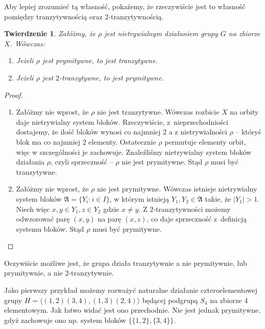 \documentclass[licencjacka]{pracamgr}
\newtheorem{thh}{Twierdzenie}[section]
\begin{document}
Aby lepiej zrozumieć tą własność, pokażemy, że rzeczywiście jest to własność pomiędzy tranzytywnością oraz $2$-tranzytywnością.

\begin{thh}
	Załóżmy, że $\rho$ jest nietrywialnym działaniem grupy $G$ na zbiorze $X$. Wówczas:
	\begin{enumerate}[label=\alph*)]
	 \item Jeżeli $\rho$ jest prymitywne, to jest tranzytywne.
	 \item Jeżeli $\rho$ jest $2$-tranzytywne, to jest prymitywne.
	\end{enumerate}
\end{thh}

\begin{proof}%
	\begin{enumerate}[label=Ad \alph*)] 
	 \item 	Załóżmy nie wprost, że $\rho$ nie jest tranzytywne. 
					Wówczas rozbicie $X$ na orbity daje nietrywialny system bloków.
					Rzeczywiście, z~nieprzechodniości dostajemy, że ilość bloków wynosi co najmniej 2 a
					z nietrywialności $\rho$ -- któryś blok ma co najmniej 2 elementy.
					Ostatecznie $\rho$ permutuje elementy orbit, więc w szczególności je zachowuje.
					Znaleźliśmy nietrywialny system bloków działania $\rho$, czyli sprzeczność -- $\rho$ nie jest prymitywne.
					Stąd $\rho$ musi być tranzytywne.
	 \item 	Załóżmy nie wprost, że $\rho$ nie jest prymitywne.
					Wówczas istnieje nietrywialny system bloków $\mathfrak{A} = \{Y_i \colon i \in I \}$, 
					w którym istnieją $Y_1, Y_2 \in \mathfrak{A}$ takie, że $|Y_1| > 1$.
					Niech więc $x,y \in Y_1, z \in Y_2$ gdzie $x \ne y$.
					Z 2-tranzytywności możemy odwzorować parę $(x, y)$ na parę $(x, z)$, co daje sprzeczność z~definicją systemu bloków.
					Stąd $\rho$ musi być prymitywne.
	\end{enumerate}
\end{proof}

Oczywiście możliwe jest, że grupa działa tranzytywnie a nie prymitywnie, lub prymitywnie, a nie 2-tranzytywnie.

Jako pierwszy przykład możemy rozważyć naturalne działanie czteroelementowej 
grupy $H= \langle (1,2)(3,4), (1,3)(2,4) \rangle$ będącej podgrupą $S_4$ na zbiorze 4 elementowym.
Jak łatwo widać jest ono przechodnie.
Nie jest jednak prymitywne, gdyż zachowuje ono np. system bloków $\{\{1,2\}, \{3,4\}\}$.
\end{document}
